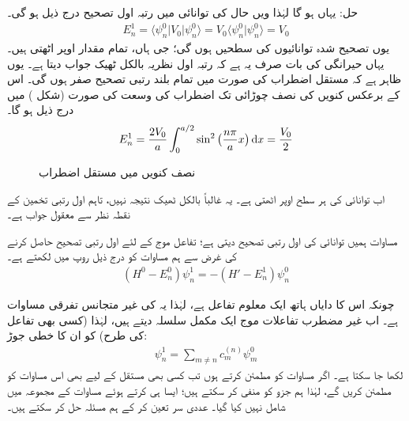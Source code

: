 حل: یہاں  ہو گا لہٰذا  ویں حال کی توانائی میں رتبہ اول تصحیح درج ذیل ہو گی۔
\begin{align*}
E_n^1 = \langle \psi_n^0 | V_0 | \psi_n^0 \rangle = V_0 \langle \psi_n^0 | \psi_n^0 \rangle = V_0
\end{align*}
یوں تصحیح شدہ توانائیوں کی سطحیں  ہوں گی؛ جی ہاں، تمام  مقدار اوپر اٹھتی ہیں۔ یہاں حیرانگی کی بات صرف یہ ہے کہ رتبہ اول نظریہ بالکل ٹھیک جواب دیتا ہے۔ یوں ظاہر ہے کہ مستقل اضطراب کی صورت میں تمام بلند رتبی تصحیح صفر ہوں گی۔  اس کے برعکس کنویں کی نصف چوڑائی تک اضطراب کی وسعت کی صورت (شکل ) میں درج ذیل ہو گا۔
\begin{align*}
E_n^1 = \frac{2V_0}{a} \int_0^{a/2} \sin^2 \big(\frac{n \pi}{a} x\big ) \dif x= \frac{V_0}{2}
\end{align*}
%
\begin{figure}
\centering
{}
\caption{نصف کنویں میں مستقل اضطراب}
\label{شکل_غیر_تابع_اضطراب_نصف_چکور_مستقل_اضطراب}
\end{figure}


اب توانائی کی ہر سطح اوپر اٹھتی ہے۔ یہ غالباً بالکل ٹھیک نتیجہ نہیں، تاہم اول رتبی تخمین کے نقطہ نظر سے معقول جواب ہے۔

 مساوات  ہمیں توانائی کی اول رتبی تصحیح دیتی ہے؛ تفاعل موج کے لئے اول رتبی تصحیح حاصل کرنے کی غرض سے ہم مساوات  کو درج ذیل روپ میں لکھتے ہے۔
\begin{align}\label{مساوات_غیر_اضطراب_تصحیح_اول_توانائی}
(H^0 - E_n^0) \psi_n^1 = - (H' - E_n^1) \psi_n^0
\end{align}

چونکہ اس کا دایاں ہاتھ ایک معلوم تفاعل ہے، لہٰذا یہ  کی غیر متجانس تفرقی مساوات ہے۔ اب غیر مضطرب تفاعلات موج ایک مکمل سلسلہ دیتے ہیں، لہٰذا (کسی بھی تفاعل کی طرح)  کو ان کا خطی جوڑ:
\begin{align}\label{مساوات_غیر_اضطراب_تصحیح_اول_تفاعل}
\psi_n^1 = \sum_{m \ne n} c_m^{(n)} \psi_m^0
\end{align}
 لکھا جا سکتا ہے۔ اگر  مساوات  کو مطمئن کرتے ہوں تب کسی بھی مستقل  کے لیے  بھی اس مساوات کو مطمئن کریں گے، لہٰذا ہم جزو  کو منفی کر سکتے ہیں؛ ایسا ہی کرتے ہوئے مساوات  کے مجموعہ میں  شامل نہیں کیا گیا۔ عددی سر  تعین کر کے ہم مسئلہ حل کر سکتے ہیں۔
 
